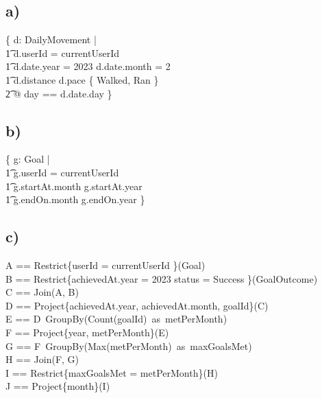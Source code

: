 \documentclass{article}
\begin{document}
\subsection*{\small a)}

\begin{zed}
\{ d: DailyMovement | \\
    \t1 d.userId = currentUserId \land \\
    \t1 d.date.year = 2023 \land d.date.month = 2 \land \\
    \t1 d.distance  \land d.pace \in \{ Walked, Ran \} \\
        \t2 @ \lblot day == d.date.day \rblot \}
\end{zed}

\subsection*{\small b)}
\begin{zed}
\{ g: Goal | \\
    \t1 g.userId = currentUserId \land \\
    \t1 g.startAt.month  \land g.startAt.year  \\
    \t1 g.endOn.month  \land g.endOn.year  \} \\
\end{zed}

\subsection*{\small c)}
\begin{zed}
A == Restrict\{userId = currentUserId \}(Goal) \\
B == Restrict\{achievedAt.year = 2023 \land status = Success \}(GoalOutcome) \\
C == Join(A, B) \\
D == Project\{achievedAt.year, achievedAt.month, goalId\}(C) \\
E == D\ GroupBy(Count(goalId)\ as\ metPerMonth) \\
F == Project\{year, metPerMonth\}(E) \\
G == F\ GroupBy(Max(metPerMonth)\ as\ maxGoalsMet) \\
H == Join(F, G) \\ 
I == Restrict\{maxGoalsMet = metPerMonth\}(H) \\
J == Project\{month\}(I) \\
\end{zed}
\end{document}
